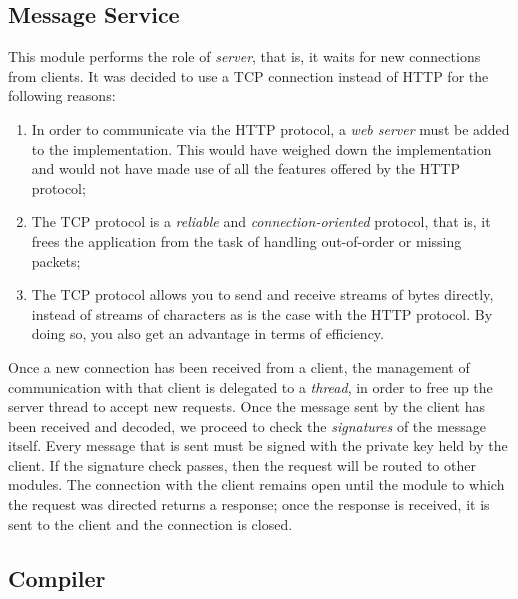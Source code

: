 \newpage
\subsection{Message Service}

This module performs the role of \textit{server}, that is, it waits for new connections from clients. It was 
decided to use a TCP connection instead of HTTP for the following reasons:
\begin{enumerate}
	\item In order to communicate via the HTTP protocol, a \textit{web server} must be added to the 
	implementation. This would have weighed down the implementation and would not have made use of all the 
	features offered by the HTTP protocol;
	\item The TCP protocol is a \textit{reliable} and \textit{connection-oriented} protocol, that is, it frees 
	the application from the task of handling out-of-order or missing packets;
	\item The TCP protocol allows you to send and receive streams of bytes directly, instead of streams of 
	characters as is the case with the HTTP protocol. By doing so, you also get an advantage in terms of 
	efficiency.
\end{enumerate}

Once a new connection has been received from a client, the management of communication with that client is 
delegated to a \textit{thread}, in order to free up the server thread to accept new requests. Once the 
message sent by the client has been received and decoded, we proceed to check the \textit{signatures} of 
the message itself. Every message that is sent must be signed with the private key held by the client. If 
the signature check passes, then the request will be routed to other modules. The connection with the client 
remains open until the module to which the request was directed returns a response; once the response is 
received, it is sent to the client and the connection is closed.

\subsection{Compiler}

